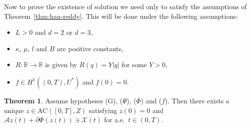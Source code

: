 \documentclass[a4paper,10pt,oneside]{amsbook}
\numberwithin{section}{chapter}
\numberwithin{equation}{chapter}
\theoremstyle{definition}
\newtheorem{thm}[prop]{Theorem}
\begin{document}
Now to prove the existence of solution we need only to satisfy the assumptions of Theorem~\ref{thm:han-reddy}. This will be done under the following assumptions:
\begin{itemize}
\item[(G)] $L>0$ and $d=2$ or $d=3$,
\item[($\Psi$)] $\kappa$, $\mu$, $l$ and $B$ are positive constants,
\item[($\Phi$)] $R\colon\mathbb{R}\to\mathbb{R}$ is given by $R(q)=Y|q|$ for some $Y>0$,
\item[($f$)] $f\in H^1((0,T),U^*)$ and $f(0)=0$.
\end{itemize}
\begin{thm}
Assume hypotheses (G), ($\Psi$), ($\Phi$) and ($f$). Then there exists a unique $z\in\text{AC}([0,T],Z)$ satisfying $z(0)=0$ and $\mathcal{A}z(t)+\partial\Phi(\dot z(t))\ni\mathcal{X}(t)$ for a.e.\ $t\in(0,T)$.
\end{thm}
\end{document}

